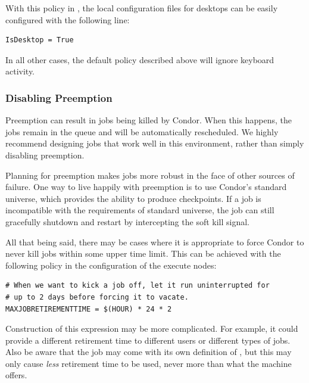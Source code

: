With this policy in , the local configuration files for
desktops can be easily configured with the following line:

\begin{verbatim}
IsDesktop = True
\end{verbatim}

In all other cases, the default policy described above will ignore
keyboard activity.

\subsubsection{\label{sec:Disabling Preemption}
Disabling Preemption}

Preemption can result in jobs being killed by Condor.  When this
happens, the jobs remain in the queue and will be automatically
rescheduled.  We highly recommend designing jobs that work well in
this environment, rather than simply disabling preemption.

Planning for preemption makes jobs more robust in the face of other
sources of failure.  One way to live happily with preemption is to use
Condor's standard universe, which provides the ability to produce
checkpoints.
If a job is incompatible with the requirements of standard universe,
the job can still gracefully shutdown and restart by intercepting the soft
kill signal.

All that being said, there may be cases where it is appropriate
to force 
Condor to never kill jobs within some upper time limit.
This can be achieved with the following policy in the configuration of
the execute nodes:

\footnotesize
\begin{verbatim}
# When we want to kick a job off, let it run uninterrupted for
# up to 2 days before forcing it to vacate.
MAXJOBRETIREMENTTIME = $(HOUR) * 24 * 2
\end{verbatim}
\normalsize

Construction of this expression may be more complicated.
For example, it could provide
a different retirement time to different users or different types of
jobs.  Also be aware that the job may come with its own definition
of , but this may only cause \emph{less}
retirement time to be used, never more than what the machine offers.

